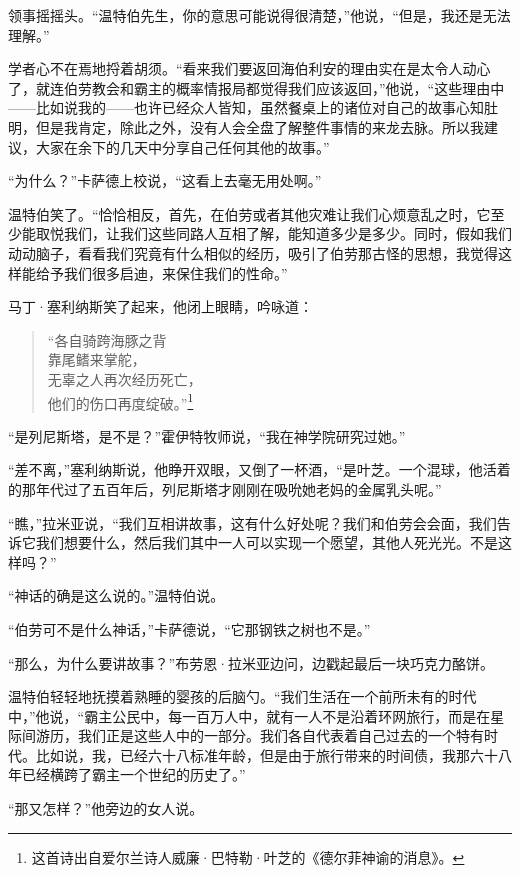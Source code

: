 \documentclass[AutoFakeBold=true]{book}
\begin{document}
领事摇摇头。``温特伯先生，你的意思可能说得很清楚，''他说，``但是，我还是无法理解。''

学者心不在焉地捋着胡须。``看来我们要返回海伯利安的理由实在是太令人动心了，就连伯劳教会和霸主的概率情报局都觉得我们应该返回，''他说，``这些理由中——比如说我的——也许已经众人皆知，虽然餐桌上的诸位对自己的故事心知肚明，但是我肯定，除此之外，没有人会全盘了解整件事情的来龙去脉。所以我建议，大家在余下的几天中分享自己任何其他的故事。''

``为什么？''卡萨德上校说，``这看上去毫无用处啊。''

温特伯笑了。``恰恰相反，首先，在伯劳或者其他灾难让我们心烦意乱之时，它至少能取悦我们，让我们这些同路人互相了解，能知道多少是多少。同时，假如我们动动脑子，看看我们究竟有什么相似的经历，吸引了伯劳那古怪的思想，我觉得这样能给予我们很多启迪，来保住我们的性命。''

马丁·塞利纳斯笑了起来，他闭上眼睛，吟咏道：

\begin{quote}
	{\kaishu ``各自骑跨海豚之背\\
	靠尾鳍来掌舵，\\
	无辜之人再次经历死亡，\\
	他们的伤口再度绽破。''}\footnote{这首诗出自爱尔兰诗人威廉·巴特勒·叶芝的《德尔菲神谕的消息》。}
\end{quote}

``是列尼斯塔，是不是？''霍伊特牧师说，``我在神学院研究过她。''

``差不离，''塞利纳斯说，他睁开双眼，又倒了一杯酒，``是叶芝。一个混球，他活着的那年代过了五百年后，列尼斯塔才刚刚在吸吮她老妈的金属乳头呢。''

``瞧，''拉米亚说，``我们互相讲故事，这有什么好处呢？我们和伯劳会会面，我们告诉它我们想要什么，然后我们其中一人可以实现一个愿望，其他人死光光。不是这样吗？''

``神话的确是这么说的。''温特伯说。

``伯劳可不是什么神话，''卡萨德说，``它那钢铁之树也不是。''

``那么，为什么要讲故事？''布劳恩·拉米亚边问，边戳起最后一块巧克力酪饼。

温特伯轻轻地抚摸着熟睡的婴孩的后脑勺。``我们生活在一个前所未有的时代中，''他说，``霸主公民中，每一百万人中，就有一人不是沿着环网旅行，而是在星际间游历，我们正是这些人中的一部分。我们各自代表着自己过去的一个特有时代。比如说，我，已经六十八标准年龄，但是由于旅行带来的时间债，我那六十八年已经横跨了霸主一个世纪的历史了。''

``那又怎样？''他旁边的女人说。
\end{document}
